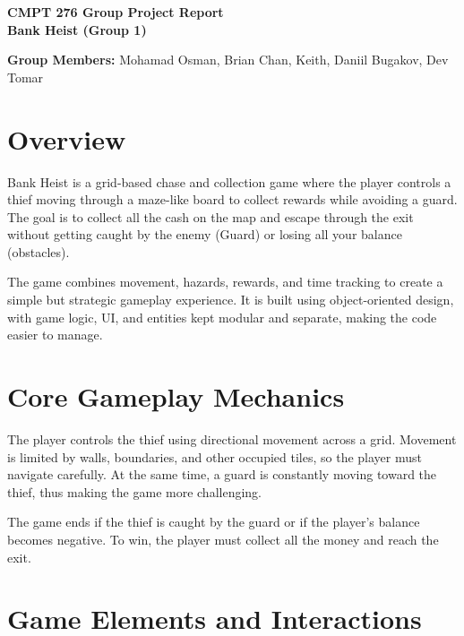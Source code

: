 \documentclass[11pt]{article}
\begin{document}
\begin{center}
    \Large \textbf{CMPT 276 Group Project Report} \\[0.3em]
    \normalsize \textbf{Bank Heist (Group 1)}
\end{center}

\vspace{0.5em}

\noindent
\textbf{Group Members:} Mohamad Osman, Brian Chan, Keith, Daniil Bugakov, Dev Tomar

\vspace{1em}


\section{Overview}

Bank Heist is a grid-based chase and collection game where the player controls a thief moving through a maze-like board to collect rewards while avoiding a guard. The goal is to collect all the cash on the map and escape through the exit without getting caught by the enemy (Guard) or losing all your balance (obstacles).

The game combines movement, hazards, rewards, and time tracking to create a simple but strategic gameplay experience. It is built using object-oriented design, with game logic, UI, and entities kept modular and separate, making the code easier to manage.

\section{Core Gameplay Mechanics}

The player controls the thief using directional movement across a grid. Movement is limited by walls, boundaries, and other occupied tiles, so the player must navigate carefully. At the same time, a guard is constantly moving toward the thief, thus making the game more challenging.

The game ends if the thief is caught by the guard or if the player’s balance becomes negative. To win, the player must collect all the money and reach the exit.

\section{Game Elements and Interactions}
\end{document}
